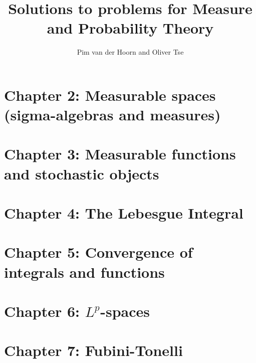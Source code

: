 \documentclass{lecturenotes}
\begin{document}
\begin{titlepage}
    \title{Solutions to problems for Measure and Probability Theory}
    \author{Pim van der Hoorn and Oliver Tse}
    \maketitle
\end{titlepage}


\section*{Chapter 2: Measurable spaces (sigma-algebras and measures)}



\section*{Chapter 3: Measurable functions and stochastic objects}



\section*{Chapter 4: The Lebesgue Integral}


\section*{Chapter 5: Convergence of integrals and functions}


\section*{Chapter 6: $L^p$-spaces}


\section*{Chapter 7: Fubini-Tonelli}

\end{document}
